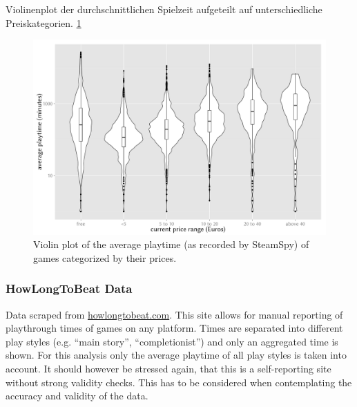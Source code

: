 Violinenplot der durchschnittlichen Spielzeit aufgeteilt auf unterschiedliche Preiskategorien. \ref{fig:steam-cost-vs-playtime-violin}

\begin{figure}[!t]
	\centering
	\includegraphics[width=1.0\columnwidth]{images/steam-cost-vs-playtime.pdf}
	\caption{Violin plot of the average playtime (as recorded by SteamSpy) of games categorized by their prices.}
\label{fig:steam-cost-vs-playtime-violin}
\end{figure}

\subsubsection{HowLongToBeat Data}

Data scraped from \url{howlongtobeat.com}. This site allows for manual reporting of playthrough times of games on any platform. Times are separated into different play styles (e.g. ``main story'', ``completionist'') and only an aggregated time is shown. For this analysis only the average playtime of all play styles is taken into account.
It should however be stressed again, that this is a self-reporting site without strong validity checks. This has to be considered when contemplating the accuracy and validity of the data.


